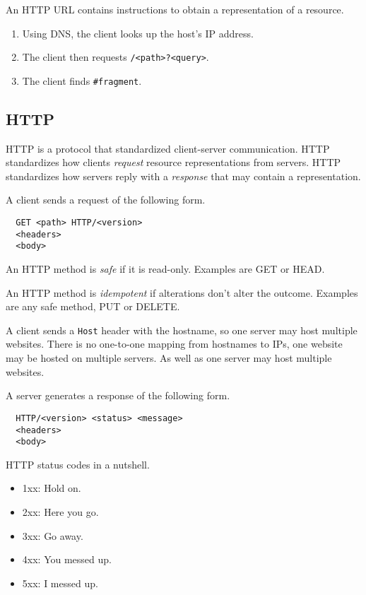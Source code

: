 \documentclass{report}
\begin{document}
An HTTP URL contains instructions
to obtain a representation of a resource.
\begin{enumerate}
  \item Using DNS, the client looks up the host's IP address.
  \item The client then requests \texttt{/<path>?<query>}.
  \item The client finds \texttt{\#fragment}.
\end{enumerate}

\subsection{HTTP}

HTTP is a protocol that standardized client-server communication.
HTTP standardizes how clients \textit{request}
resource representations from servers.
HTTP standardizes how servers reply with a \textit{response}
that may contain a representation.

A client sends a request of the following form.
\begin{lstlisting}
  GET <path> HTTP/<version>
  <headers>
  <body>
\end{lstlisting}

An HTTP method is \textit{safe} if it is read-only.
Examples are GET or HEAD.

An HTTP method is \textit{idempotent} if
alterations don't alter the outcome.
Examples are any safe method, PUT or DELETE.

A client sends a \texttt{Host} header with the hostname,
so one server may host multiple websites.
There is no one-to-one mapping from hostnames to IPs,
one website may be hosted on multiple servers.
As well as one server may host multiple websites.

A server generates a response of the following form.
\begin{lstlisting}
  HTTP/<version> <status> <message>
  <headers>
  <body>
\end{lstlisting}

HTTP status codes in a nutshell.
\begin{itemize}
  \item 1xx: Hold on.
  \item 2xx: Here you go.
  \item 3xx: Go away.
  \item 4xx: You messed up.
  \item 5xx: I messed up.
\end{itemize}
\end{document}
